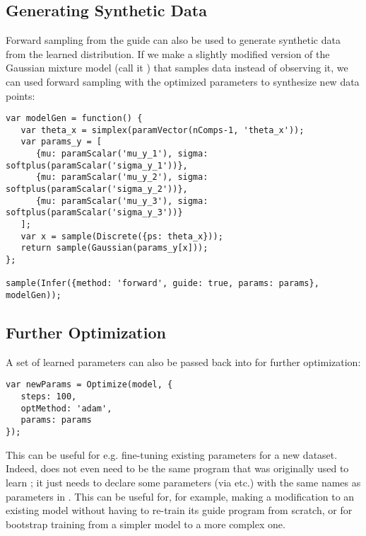 \subsection{Generating Synthetic Data}

Forward sampling from the guide can also be used to generate synthetic data from the learned distribution. If we make a slightly modified version of the Gaussian mixture model (call it ) that samples data instead of observing it, we can used forward sampling with the optimized parameters  to synthesize new data points:
\begin{lstlisting}
var modelGen = function() {
   var theta_x = simplex(paramVector(nComps-1, 'theta_x'));
   var params_y = [
      {mu: paramScalar('mu_y_1'), sigma: softplus(paramScalar('sigma_y_1'))},
      {mu: paramScalar('mu_y_2'), sigma: softplus(paramScalar('sigma_y_2'))},
      {mu: paramScalar('mu_y_3'), sigma: softplus(paramScalar('sigma_y_3'))}
   ];
   var x = sample(Discrete({ps: theta_x}));
   return sample(Gaussian(params_y[x]));
};

sample(Infer({method: 'forward', guide: true, params: params}, modelGen));
\end{lstlisting}

\subsection{Further Optimization}
\label{sec:furtherOptim}

A set of learned parameters  can also be passed back into  for further optimization:
\begin{lstlisting}
var newParams = Optimize(model, {
   steps: 100,
   optMethod: 'adam',
   params: params
});
\end{lstlisting}
This can be useful for e.g. fine-tuning existing parameters for a new dataset. Indeed,  does not even need to be the same program that was originally used to learn ; it just needs to declare some parameters (via  etc.) with the same names as parameters in . This can be useful for, for example, making a modification to an existing model without having to re-train its guide program from scratch, or for bootstrap training from a simpler model to a more complex one.
